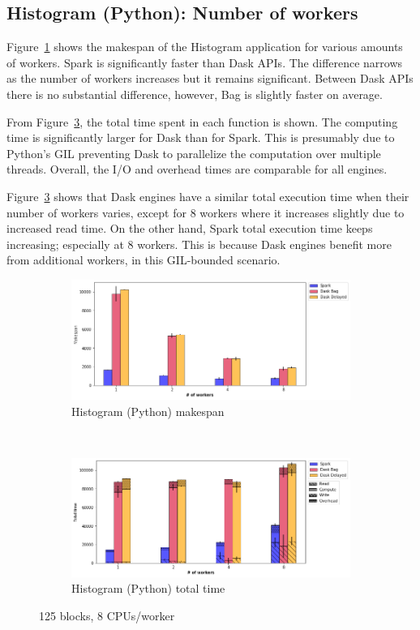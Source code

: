 \documentclass[conference]{IEEEtran}
\begin{document}
\subsection{Histogram (Python): Number of workers}
Figure~\ref{fig:histo_ms_worker} shows the makespan of the Histogram application for various
amounts of workers. Spark is significantly faster than Dask APIs. The difference
narrows as the number of workers increases but it remains significant. Between Dask APIs
there is no substantial difference, however, Bag is slightly faster on average.

From Figure~\ref{fig:histo_tt_worker}, the total time spent in each function is
shown. The computing time is significantly larger for Dask than for Spark. This is
presumably due to Python's GIL preventing Dask to parallelize the computation
over
multiple threads. Overall, the I/O and overhead times are comparable for all engines.

Figure~\ref{fig:histo_tt_worker} shows that Dask engines have a similar
total execution time when their number of workers varies, except for 8
workers where it increases slightly due to increased read time.
On the other hand, Spark total execution time keeps increasing; especially at 8
workers. This is because Dask engines benefit more from additional workers, in
this GIL-bounded scenario.

\begin{figure}[!b]
    \centering
    \begin{subfigure}[b]{\columnwidth}
        \includegraphics[clip,width=\columnwidth]{images/histo_worker.png}%
        \caption{Histogram (Python) makespan}\label{fig:histo_ms_worker}
    \end{subfigure}
    \\
    \begin{subfigure}[b]{\columnwidth}
        \includegraphics[clip,width=\columnwidth]{images/histo_idle_worker.png}%
        \caption{Histogram (Python) total time}\label{fig:histo_tt_worker}
    \end{subfigure}
    \caption{125 blocks, 8 CPUs/worker}
\end{figure}
\end{document}

